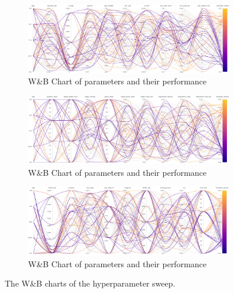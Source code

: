 \documentclass[../xlapes02]{subfiles}
\begin{document}
    \begin{figure}
        \begin{subfigure}[t]{\textwidth}
            \centering
            \includegraphics[width=\linewidth]{image/wandb/wb1}
            \caption{W\&B Chart of parameters and their performance}
            \label{fig:wb-chart1}
        \end{subfigure}

        \vspace{0.5cm}

        \begin{subfigure}[t]{\textwidth}
            \centering
            \includegraphics[width=\linewidth]{image/wandb/wb2}
            \caption{W\&B Chart of parameters and their performance}
            \label{fig:wb-chart2}
        \end{subfigure}

        \vspace{0.5cm}

        \begin{subfigure}[t]{\textwidth}
            \centering
            \includegraphics[width=\linewidth]{image/wandb/wb3}
            \caption{W\&B Chart of parameters and their performance}
            \label{fig:wb-chart3}
        \end{subfigure}

        \caption{The W\&B charts of the hyperparameter sweep.}
        \label{fig:wb-charts}
    \end{figure}
\end{document}
